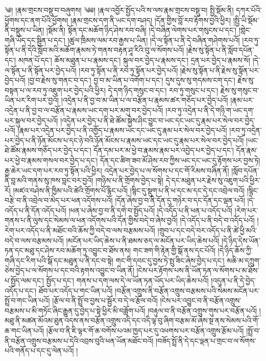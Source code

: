 \setcounter{footnote}{0} 
༄། །རྣམ་གྲངས་བསྡུ་བ་བཞུགས། ༄༅། །རྣལ་འབྱོར་སྤྱོད་པའི་ས་ལས་རྣམ་གྲངས་བསྡུ་བ། སྤྱི་སྡོམ་ནི། དཀར་པོའི་ཕྱོགས་དང་ནག་པོའི་ཕྱོགས། །རྣམ་གྲངས་དག་ནི་ཡང་དག་བཤད། །དོན་གྱིས་བློ་རབ་རྟོགས་བྱའི་ཕྱིར། །སྤྱི་ཡི་སྡོམ་ནི་བསྡུས་པ་ཡིན། །སྡོམ་ནི། སྟོན་དང་མཆོག་ཉིད་ཤེས་རབ་བཞི། །དེ་བཞིན་ལེགས་པར་གསུངས་པ་དང་། །གླེང་གཞི་ཡོད་དང་སྦྱིན་པ་དང་། །ཚུལ་ཁྲིམས་ལམ་རབ་རྒྱས་པ་ཡིན། །དེ་ལ་སྟོན་པ་ནི་དེ་བཞིན་གཤེགས་པའོ། །རབ་ཏུ་སྟོན་པ་ནི་དེའི་སློབ་མའི་མཆོག་རྣམས་ཏེ་གནས་བརྟན་ཤཱ་རིའི་བུ་ལ་སོགས་པའོ། །རྗེས་སུ་སྟོན་པ་ནི་སློབ་དཔོན་དང་། མཁན་པོ་དང་། ཆོས་མཐུན་པ་པ་རྣམས་དང་། སྐུལ་བར་བྱེད་པ་རྣམས་དང་། དྲན་པར་བྱེད་པ་རྣམས་སོ། །དེ་ལ་སྟོན་པ་ནི་སྟོན་པར་བྱེད་པའོ། །རབ་ཏུ་སྟོན་པ་ནི་རབ་ཏུ་སྟོན་པར་བྱེད་པའོ། །རྗེས་སུ་སྟོན་པ་ནི་རྗེས་སུ་སྟོན་པར་བྱེད་པའོ། །བྱ་བ་རྗེས་སུ་གནང་བ་དང་། བྱ་བ་མ་ཡིན་པ་འགོག་པ་དང་། དུས་དུས་སུ་གདམས་ངག་དང་། རྗེས་སུ་བསྟན་པ་ལ་རབ་ཏུ་འཇུག་པར་བྱེད་པའི་ཕྱིར། དེ་དག་ཉིད་གསུང་བ་དང་། རབ་ཏུ་གསུང་པ་དང་། རྗེས་སུ་གསུང་བ་ཡིན་པར་རིག་པར་བྱའོ། །འདྲེན་པ་ནི་བྱ་བ་མ་ཡིན་པ་ལ་བརྩོན་པ་རྣམས་ཚར་གཅོད་པར་བྱེད་པའོ། །རྣམ་པར་འདྲེན་པ་ནི་བྱ་བ་ལ་བརྩོན་པ་རྣམས་ཡང་དག་པར་མགུ་བར་བྱེད་པའོ། །རབ་ཏུ་འདྲེན་པ་ནི་དེ་གཉི་ག་ཡང་དག་པར་སྐུལ་བར་བྱེད་པའོ། །འདྲེན་པར་བྱེད་པ་ནི་ཐེ་ཚོམ་སྐྱེས་ཤིང་བྱུང་བ་ཡང་དང་ཡང་དུ་རྣམ་པར་སེལ་བར་བྱེད་པའོ། །རྣམ་པར་འདྲེན་པར་བྱེད་པ་ནི་འགྱོད་པ་རྣམས་ཡང་དང་ཡང་དུ་རྣམ་པར་སེལ་བར་བྱེད་པའོ། །རབ་ཏུ་འདྲེན་པར་བྱེད་པ་ནི་ཉོན་མོངས་པ་དང་ཉེ་བའི་ཉོན་མོངས་པ་རྣམས་ཡང་དང་ཡང་དུ་རྣམ་པར་སེལ་བར་བྱེད་པའོ། །ཡང་ཐེ་ཚོམ་རྣམས་གཅོད་པར་བྱེད་པ་དང་། དོན་དམ་པར་མ་ཕྱེ་བ་རྣམས་རྣམ་པར་འབྱེད་པར་བྱེད་པ་དང་། དོན་རྣམ་པར་ཕྱེ་བ་རྣམས་གསལ་བར་བྱེད་པ་དང་། དོན་དང་ཚིག་ཟབ་མོ་ཤེས་རབ་ཀྱིས་ཡང་དང་ཡང་དུ་རྟོགས་པར་བྱས་ཏེ། རྒྱ་ཆེར་ཡང་དག་པར་རབ་ཏུ་སྟོན་པའི་ཕྱིར། འདྲེན་པར་བྱེད་པ་ལ་སོགས་པ་དང་གོ་རིམས་བཞིན་ནོ། །སློབ་དཔོན་ནི་བླ་མའི་གནས་སུ་ཁས་བླང་བར་བྱའོ། །གཉིས་པ་ནི་གྲོགས་བྱེད་པ་སྟེ། དེ་དང་མཐུན་པར་རྗེས་སུ་འཇུག་པའི་ཕྱིར་རོ། །མཛའ་བཤེས་ནི་ཁྱིམ་པའི་ཚེའི་གྲོགས་པོ་རྙིང་པའོ། །སྙིང་དུ་སྡུག་པ་ནི་ཕ་དང་མ་དང་དེ་དང་འབྲེལ་བའོ། །སྙིང་བརྩེ་བ་ནི་འབྲེལ་བ་མེད་པར་ཕན་འདོགས་པའོ། །དོན་ཞེས་བྱ་བ་ནི་དོན་དུ་གཉེར་བ་དང་དོན་དང་ལྡན་པའོ། །དེ་འདོད་པ་ནི་དོན་འདོད་པའོ། །ཕན་པ་ཞེས་བྱ་བ་ནི་དགེ་བ་སྤྱོད་པའོ། །དེ་འདོད་པ་ནི་ཕན་པ་འདོད་པའོ། །རེག་པར་གནས་པ་ནི་ལུས་དང་སེམས་ལ་ཕན་འདོགས་པའི་དོན་གྱིས་བདེ་བ་ཞེས་བྱའོ། །དེ་འདོད་པ་ནི་བདེ་བ་འདོད་པའོ། །རེག་པར་འདོད་པ་ནི་མཐོང་བའི་ཆོས་ཀྱི་བདེ་བ་ལས་བརྩམས་པའོ། །གྲུབ་པ་དང་བདེ་བར་འདོད་པ་ནི་ཚེ་ཕྱི་མའི་བདེ་བ་ལས་བརྩམས་པའོ། །མངོན་པར་ཡིད་ཆེས་པ་ནི་ཐམས་ཅད་ལ་མངོན་པར་ཡིད་ཆེས་པའོ། །དེ་ཉིད་དེས་ཡོན་ཏན་དང་མཐུ་དང་ཤེས་རབ་མཆོག་ཏུ་འབྱུང་བ་ཐོས་ནས། གང་ཟག་གི་རྟེན་གྱི་སྒོ་ནས་དང་པོའོ། །དེ་ཉིད་ཆོས་ཀྱི་གཞི་དང་རིག་པའི་སྒོ་དང་མཐུན་པ་ནི་དང་བ་སྟེ། གང་གི་དབང་དུ་བྱས་ཏེ་སྤུ་ཟིང་ཞེས་བྱེད་པ་དང་། མཆི་མ་དཀྲུག་ཅེས་བྱེད་པ་ལ་སོགས་པ་དང་བའི་རྟགས་འབྱུང་བ་ཡིན་ནོ། །ངེས་པར་རྟོགས་པས་ནི་ཡོན་ཏན་ལ་སོགས་པ་མ་ཐོས་པ་སྤྱོད་ལམ་དང་། སྤྱོད་པ་དང་། གནས་པ་དག་ལས་དེ་ལ་ཡོན་ཏན་ཡོད་པར་ཡིད་ཆེས་པའོ། །འདུན་པ་ནི་དེ་བྱེད་འདོད་པ་དང་། ཐོབ་པར་འདོད་པ་གང་ཡིན་པའོ། །བརྩོན་འགྲུས་ནི་བརྩོན་འགྲུས་བརྩམས་པའི་སེམས་མངོན་པར་སྤྲོ་བ་གང་ཡིན་པའོ། །རྩོལ་བ་ནི་སྤྲོ་བ་བྱས་པ་སྦྱོར་བ་དེ་ལ་རྩོལ་བའོ། །ངེས་པར་འབྱུང་བ་ནི་བརྩོན་འགྲུས་བརྩམས་པ་མི་གཏོང་ཞིང་རྒྱུན་དུ་བྱེད་པ་སྟེ་ཕྱིར་མི་བཟློག་པའོ། །བརྟུལ་བ་ནི་བརྩོན་འགྲུས་གུས་པར་བརྩོན་པའོ། །མཐུ་ནི་མཚན་མོའམ་ཐུན་འདས་ནས་བརྩོན་འགྲུས་འདི་དང་འདི་ལྟ་བུ་ཞིག་བརྩམ་མོ་ཞེས་སྔ་ནས་སེམས་པའི་གོ་ཆ་གང་ཡིན་པའོ། །རྩོལ་བ་ནི་ཇི་ལྟར་གོ་ཆ་བགོས་པའམ་ཁྱད་པར་དུ་འཕགས་པར་བརྩོན་འགྲུས་རྩོམ་པའོ། །སྤྲོ་བ་ནི་བརྩོན་འགྲུས་བརྩམས་པ་དེའི་འབྲས་བུའི་ཕན་ཡོན་མཐོང་བའོ། །བཟོད་སྤྲོ་ནི་དེ་དང་ལྡན་པ་གྲང་བ་ལ་སོགས་པའི་གནོད་པ་དང་དུ་ལེན་པའོ། །
